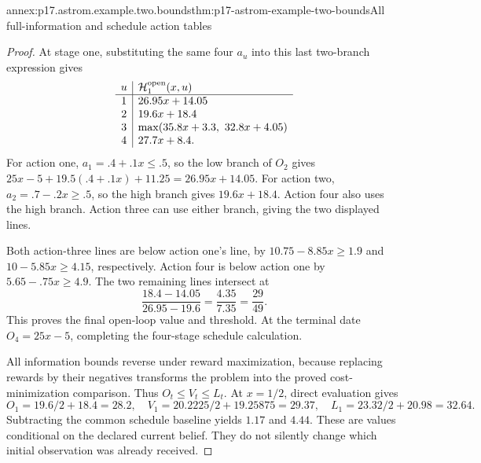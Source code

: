 \begin{annexitem}{annex:p17.astrom.example.two.bounds}{thm:p17-astrom-example-two-bounds}{All full-information and schedule action tables}
\begin{proof}
At stage one, substituting the same four \(a_u\)
into this last two-branch expression gives
\[
 \begin{array}{c|l}
 u&\mathcal H_1^{\rm open}(x,u)\\ \hline
 1&26.95x+14.05\\
 2&19.6x+18.4\\
 3&\max(35.8x+3.3,\ 32.8x+4.05)\\
 4&27.7x+8.4 .
 \end{array}
\]
For action one, \(a_1=.4+.1x\leq.5\), so the
low branch of \(O_2\) gives
\(25x-5+19.5(.4+.1x)+11.25=26.95x+14.05\).
For action two, \(a_2=.7-.2x\geq.5\), so the
high branch gives \(19.6x+18.4\).
Action four also uses the high branch. Action three
can use either branch, giving the two displayed lines.

Both action-three lines are below action one's line,
by \(10.75-8.85x\geq1.9\) and
\(10-5.85x\geq4.15\), respectively.
Action four is below action one by
\(5.65-.75x\geq4.9\).
The two remaining lines intersect at
\[
                  \frac{18.4-14.05}{26.95-19.6}
                       =\frac{4.35}{7.35}=\frac{29}{49}.
\]
This proves the final open-loop value and threshold.
At the terminal date \(O_4=25x-5\), completing
the four-stage schedule calculation.

All information bounds reverse under reward maximization,
because replacing rewards by their negatives transforms
the problem into the proved cost-minimization comparison.
Thus \(O_t\leq V_t\leq L_t\).
At \(x=1/2\), direct evaluation gives
\[
 O_1=19.6/2+18.4=28.2,\quad
 V_1=20.2225/2+19.25875=29.37,\quad
 L_1=23.32/2+20.98=32.64 .
 \]
Subtracting the common schedule baseline yields
\(1.17\) and \(4.44\). These are values conditional
on the declared current belief. They do not silently
change which initial observation was already received.
\end{proof}
\end{annexitem}

